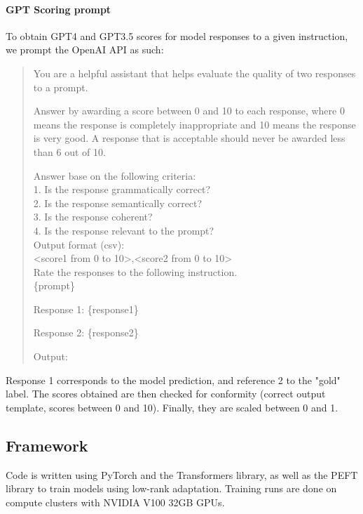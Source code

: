 \paragraph{GPT Scoring prompt}
To obtain GPT4 and GPT3.5 scores for model responses to a given instruction, we prompt the OpenAI API as such:

\begin{quote}
You are a helpful assistant that helps evaluate the quality of two responses to a prompt.

Answer by awarding a score between 0 and 10 to each response, where 0 means the response is completely inappropriate and 10 means the response is very good.
A response that is acceptable should never be awarded less than 6 out of 10.

Answer base on the following criteria:\\
1. Is the response grammatically correct?\\
2. Is the response semantically correct?\\
3. Is the response coherent?\\
4. Is the response relevant to the prompt?\\

Output format (csv):\\
<score1 from 0 to 10>,<score2 from 0 to 10>\\

Rate the responses to the following instruction.\\
\{prompt\}

Response 1: 
\{response1\}


Response 2: 
\{response2\}

Output:
\end{quote}

Response 1 corresponds to the model prediction, and reference 2 to the "gold" label. The scores obtained are then checked for conformity (correct output template, scores between 0 and 10). Finally, they are scaled between 0 and 1.



\subsection{Framework}
Code is written using PyTorch and the Transformers library, as well as the PEFT library to train models using  low-rank adaptation. Training runs are done on compute clusters with NVIDIA V100 32GB GPUs.


